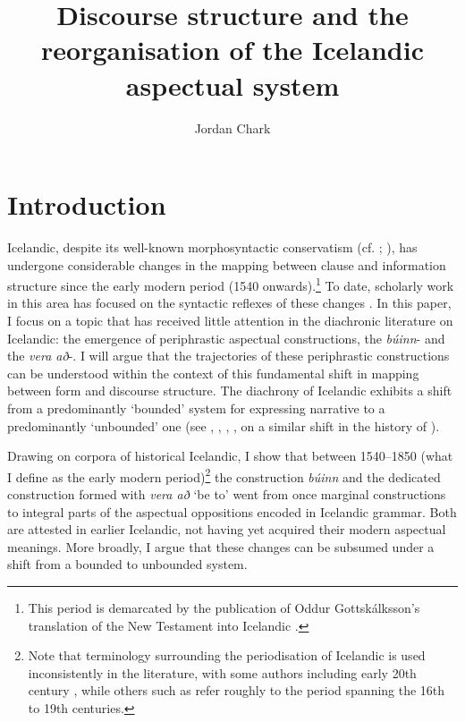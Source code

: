 \documentclass[output=paper,colorlinks,citecolor=brown]{langscibook}
\author{Jordan Chark\affiliation{Humboldt-Universität zu Berlin \&  Leibniz-Zentrum Allgemeine Sprachwissenschaft}}
\title{Discourse structure and the reorganisation of the Icelandic aspectual system}
\begin{document}
\maketitle

\section{Introduction}\label{sec:Chark1}

Icelandic, despite its well-known morphosyntactic conservatism (cf. \citeauthor{fridhriksson2011modern}  \citeyear{fridhriksson2011modern}; \citeauthor{rognvaldsson2011morphosyntactic} \citeyear{rognvaldsson2011morphosyntactic}), has undergone considerable changes in the mapping between clause and information structure since the early modern period (1540 onwards).\footnote{This period is demarcated by the publication of Oddur Gottskálksson's translation of the New Testament into Icelandic \citep{ottosson1990islensk}.} To date, scholarly work in this area has focused on the syntactic reflexes of these changes \citep{rognvaldsson1995old, rognvaldsson2002thadh, booth-beck20200jhs}. In this paper, I focus on a topic that has received little attention in the diachronic literature on Icelandic: the emergence of periphrastic aspectual constructions, the \textit{búinn}-  and the \textit{vera að}-. I will argue that the trajectories of these periphrastic constructions can be understood within the context of this fundamental shift in mapping between form and discourse structure. The diachrony of Icelandic exhibits a shift from a predominantly `bounded' system for expressing narrative to a predominantly `unbounded' one (see \citeauthor{petre2010functions} \citeyear{petre2010functions}, \citeyear{petre2014constructions}, \citeauthor{los2012} \citeyear{los2012}, \citeauthor{bech2014} \citeyear{bech2014}, \citeauthor{fanego2024english} \citeyear{fanego2024english} on a similar shift in the history of ).

Drawing on corpora of historical Icelandic, I show that between 1540--1850 (what I define as the early modern period)\footnote{Note that terminology surrounding the periodisation of Icelandic is used inconsistently in the literature, with some authors including early 20th century \citep{svavars2014}, while others such as \citet{brendel2023translation} refer roughly to the period spanning the 16th to 19th centuries.} the   construction \textit{búinn} and the dedicated   construction formed with \textit{vera að} `be to' went from once marginal constructions to integral parts of the aspectual oppositions encoded in Icelandic grammar. Both are attested in earlier Icelandic, not having yet acquired their modern aspectual meanings. More broadly, I argue that these changes can be subsumed under a shift from a bounded to unbounded system.
\end{document}
